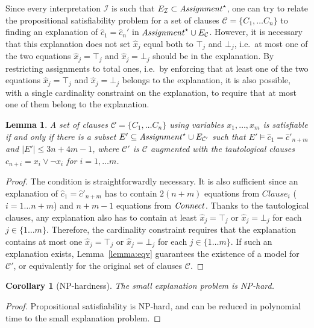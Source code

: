 \documentclass{easychair}
\newtheorem{corollary}{Corollary}
\newtheorem{lemma}{Lemma}
\begin{document}
Since every interpretation $\mathcal{I}$ is such that $E_{\mathcal{I}} \subset
{\it Assignment}^\star$, one can try to relate the propositional satisfiability
problem for a set of clauses $\mathcal{C}= \{C_1, \dots C_n\}$ to finding an
explanation of $\hat{c}_1 = \hat{c}_n'$ in ${\it Assignment}^\star \cup
E_{\mathcal{C}}$.  However, it is necessary that this explanation does not set
$\hat{x}_j$ equal both to $\top_j$ and $\bot_j$, i.e.\ at most one of the two
equations $\hat{x}_j = \top_j$ and $\hat{x}_j = \bot_j$ should be in the
explanation.  By restricting assignments to total ones, i.e.\ by enforcing that
at least one of the two equations $\hat{x}_j = \top_j$ and $\hat{x}_j = \bot_j$
belongs to the explanation, it is also possible, with a single cardinality
constraint on the explanation, to require that at most one of them belong to the
explanation.


\begin{lemma}
A set of clauses $\mathcal{C}= \{C_1, \dots C_n\}$ using variables $x_1,\dots,
x_m$ is satisfiable if and only if there is a subset $E' \subseteq
{\it Assignment}^\star \cup E_{\mathcal{C}'}$ such that $E'\models \hat{c}_1 =
\hat{c}'_{n+m}$ and $|E'| \leq 3n+4m-1$, where $\mathcal{C}'$ is $\mathcal{C}$
augmented with the tautological clauses $c_{n+i} = x_i \vee \neg x_i$ for
$i=1,\dots m$.
\end{lemma}
\begin{proof}
The condition is straightforwardly necessary.  It is also sufficient since an
explanation of $\hat{c}_1 = \hat{c}'_{n+m}$ has to contain $2(n + m)$
equations from $Clause_i$ ($i= 1\dots n + m$) and $n + m - 1$ equations from
${\it Connect}$.  Thanks to the tautological clauses, any explanation also has to
contain at least $\hat{x}_j = \top_j$ or $\hat{x}_j = \bot_j$ for each
$j\in\{1\dots m\}$. Therefore, the cardinality constraint requires that the explanation
contains at most one $\hat{x}_j = \top_j$ or $\hat{x}_j = \bot_j$ for each
$j\in\{1\dots m\}$.  If such an explanation exists, Lemma~\ref{lemma:eqv}
guarantees the existence of a model for $\mathcal{C'}$, or equivalently for
the original set of clauses $\mathcal{C}$.
\end{proof}

\begin{corollary}[NP-hardness]
\label{lemma:nphardness}
The small explanation problem is NP-hard.
\end{corollary}
\begin{proof}
Propositional satisfiability is NP-hard, and can be reduced in polynomial time to the small explanation problem.
\end{proof}
\end{document}

